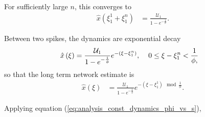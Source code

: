 \begin{enumerate}
For sufficiently large $n$, this converges to 
\begin{align*}
\hat
{
	x
}
\left(
	\xi_1^1 + \xi_1^n
\right)
&=
\frac
{
	\mathcal{U}_1
}
{
	1 - e^
	{
		-\frac
		{
			1
		}
		{
			\phi
		}
	}
}.
\end{align*}

Between two spikes, the dynamics are exponential decay
\begin{align*}
\hat{
	x
}
\left(
	\xi
\right)
&=
\frac
{
\mathcal{U}_1
}
{
	1 - e^
	{
		-\frac
		{
			1
		}
		{
			\phi
		}
	}
}
e^
{
	-\left(
		\xi - \xi_1^n
	\right)
}
,
\hspace{4mm}
0 \leq \xi - \xi_1^n  < 
\frac
{
	1
}
{
	\phi
,}
\end{align*}
so that the long term network estimate is
\begin{align*}
\label{eq:analysis:constant_driving_constant_dynamics_estimate_equation_implicit}
\hat{
x
}
\left(
	\xi
\right)
&=
\frac
{
	\mathcal{U}_1
}
{
	1 - e^
	{
		-\frac
		{
			1
		}
		{
			\phi
		}
	}
}
e^
{
	- (\xi - \xi_1^1) 
	\mod
	{
		\frac
		{
			1
		}
		{
			\phi
		}
	}
}.
\end{align*}

Applying equation (\ref{eq:analysis_const_dynamics_phi_vs_s}),


\end{enumerate}
